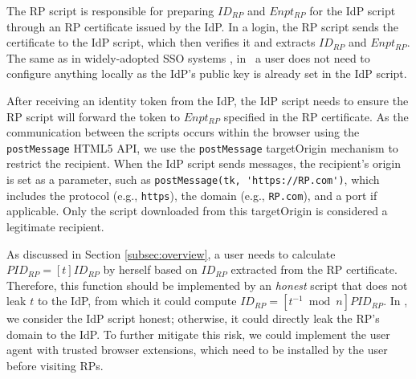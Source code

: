 
The RP script is responsible for preparing $ID_{RP}$ and $Enpt_{RP}$ for the IdP script through an RP certificate issued by the IdP. %
In a login, the RP script sends the certificate to the IdP script, which then verifies it and extracts $ID_{RP}$ and $Enpt_{RP}$.
The same as in widely-adopted SSO systems \cite{OpenIDConnect, rfc6749, SAML, SAMLIdentifier}, in \usso\ a user does not need to configure anything locally as the IdP's public key is already set in the IdP script.

After receiving an identity token from the IdP, the IdP script needs to ensure the RP script will forward the token to $Enpt_{RP}$ %
specified in the RP certificate.
As the communication between the scripts occurs within the browser using the \verb+postMessage+ HTML5 API, %
we use the \verb+postMessage+ targetOrigin mechanism \cite{postm-targeto} to restrict the recipient. %
 When the IdP script sends messages, the recipient's origin is set as a parameter, such as \verb+postMessage(tk, 'https://RP.com')+, which includes the protocol (e.g., \verb+https+), the domain (e.g., \verb+RP.com+), and a port if applicable.
Only the script downloaded from this targetOrigin is considered a legitimate recipient.


\newc
As discussed in Section \ref{subsec:overview}, a user needs to calculate $PID_{RP} = [t]ID_{RP}$ by herself based on $ID_{RP}$ extracted from the RP certificate. Therefore, this function should be implemented by an \emph{honest} script that does not leak $t$ to the IdP, from which it could compute $ID_{RP} = [t^{-1}\bmod n]PID_{RP}$. In \usso, we consider the IdP script honest; otherwise, it could directly leak the RP's domain to the IdP. To further mitigate this risk, we could implement the user agent with trusted browser extensions, which need to be installed by the user before visiting RPs.
\oldc

